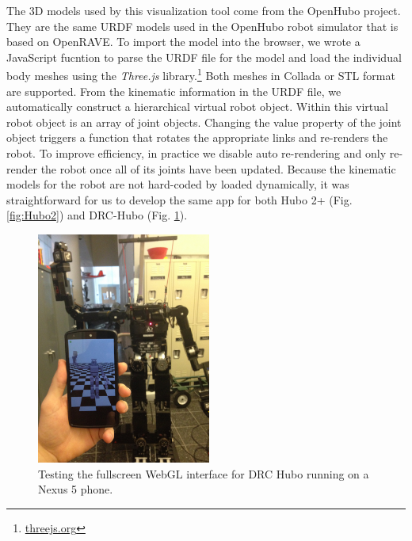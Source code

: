 \documentclass[letterpaper, 10 pt, conference]{ieee/ieeeconf}  %
\begin{document}
The 3D models used by this visualization tool come from the OpenHubo project.\cite{lofaro2012humanoid}
They are the same URDF models used in the OpenHubo robot simulator that is based on OpenRAVE.
To import the model into the browser, we wrote a JavaScript fucntion to parse the URDF file for the model and load the individual body meshes using the \textit{Three.js} library.\footnote{\url{threejs.org}}
Both meshes in Collada or STL format are supported.
From the kinematic information in the URDF file, we automatically construct a hierarchical virtual robot object.
Within this virtual robot object is an array of joint objects.
Changing the value property of the joint object triggers a function that rotates the appropriate links and re-renders the robot.
To improve efficiency, in practice we disable auto re-rendering and only re-render the robot once all of its joints have been updated.
Because the kinematic models for the robot are not hard-coded by loaded dynamically, it was straightforward for us to develop the same app for both Hubo 2+ (Fig. \ref{fig:Hubo2}) and DRC-Hubo (Fig. \ref{fig:DRCHubo}).

\begin{figure}[thpb]
  \centering
  \includegraphics[height=3in]{figures/drchubo.jpg}
  \caption{Testing the fullscreen WebGL interface for DRC Hubo running on a Nexus 5 phone.}
  \label{fig:DRCHubo}
\end{figure}

\end{document}
